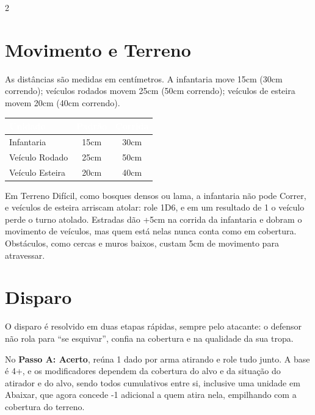 \documentclass[10pt]{article}
\begin{document}
\begin{multicols}{2}
\section{Movimento e Terreno}

As distâncias são medidas em centímetros. A infantaria move 15cm (30cm correndo); veículos rodados movem 25cm (50cm correndo); veículos de esteira movem 20cm (40cm correndo).

\begin{center}
\footnotesize
\setlength{\tabcolsep}{3pt}
\begin{tabular}{@{}lcc@{}}
\toprule
\rowcolor{vinho}
\textcolor{white}{\textbf{Unidade}} & \textcolor{white}{\textbf{Padrão}} & \textcolor{white}{\textbf{Corrida}} \\
\midrule
Infantaria & 15cm & 30cm \\
Veículo Rodado & 25cm & 50cm \\
Veículo Esteira & 20cm & 40cm \\
\bottomrule
\end{tabular}
\end{center}

Em Terreno Difícil, como bosques densos ou lama, a infantaria não pode Correr, e veículos de esteira arriscam atolar: role 1D6, e em um resultado de 1 o veículo perde o turno atolado. Estradas dão +5cm na corrida da infantaria e dobram o movimento de veículos, mas quem está nelas nunca conta como em cobertura. Obstáculos, como cercas e muros baixos, custam 5cm de movimento para atravessar.

\section{Disparo}

O disparo é resolvido em duas etapas rápidas, sempre pelo atacante: o defensor não rola para ``se esquivar'', confia na cobertura e na qualidade da sua tropa.

No \textbf{Passo A: Acerto}, reúna 1 dado por arma atirando e role tudo junto. A base é 4+, e os modificadores dependem da cobertura do alvo e da situação do atirador e do alvo, sendo todos cumulativos entre si, inclusive uma unidade em Abaixar, que agora concede -1 adicional a quem atira nela, empilhando com a cobertura do terreno.


\end{multicols}
\end{document}
